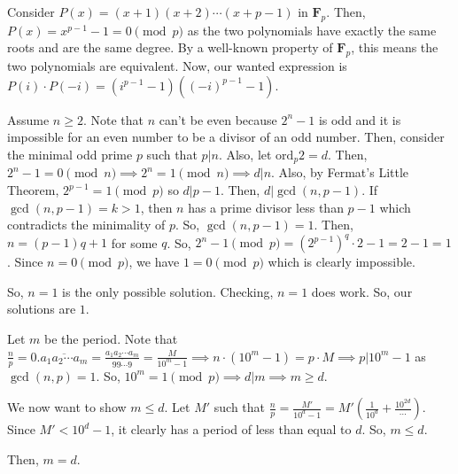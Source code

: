 \documentclass[11pt]{article}
\begin{document}

\begin{sol}
Consider $P(x)=(x+1)(x+2)\cdots (x+p-1)$ in $\mathbf{F}_{p}$. Then, $P(x)=x^{p-1}-1=0\pmod{p}$ as the two polynomials have exactly the same roots and are the same degree. By a well-known property of $\mathbf{F}_{p}$, this means the two polynomials are equivalent. Now, our wanted expression is $P(i)\cdot P(-i)=\boxed{(i^{p-1}-1)((-i)^{p-1}-1)}$.
\end{sol}


\begin{sol}
Assume $n\ge 2$. Note that $n$ can't be even because $2^{n}-1$ is odd and it is impossible for an even number to be a divisor of an odd number. Then, consider the minimal odd prime $p$ such that $p|n$. Also, let $\text{ord}_{p} 2 =d$. Then, $2^{n}-1=0\pmod{n} \implies 2^{n}=1\pmod{n}\implies d|n$. Also, by Fermat's Little Theorem, $2^{p-1}=1\pmod{p}$ so $d|p-1$. Then, $d|\gcd(n,p-1)$. If $\gcd(n,p-1)=k>1$, then $n$ has a prime divisor less than $p-1$ which contradicts the minimality of $p$. So, $\gcd(n,p-1)=1$. Then, $n=(p-1)q+1$ for some $q$. So, $2^{n}-1\pmod{p}=(2^{p-1})^{q}\cdot 2-1=2-1=1$. Since $n=0\pmod{p}$, we have $1=0\pmod{p}$ which is clearly impossible.

So, $n=1$ is the only possible solution. Checking, $n=1$ does work. So, our solutions are $\boxed{1}$.
\end{sol}


\begin{sol}[1]
Let $m$ be the period. Note that $\frac{n}{p}=0.\overline{a_{1}a_{2}\cdots a_{m}}=\frac{a_{1}a_{2}\cdots a_{m}}{\overline{99\cdots 9}}=\frac{M}{10^{m}-1}\implies n\cdot (10^{m}-1)=p\cdot M\implies p|10^{m}-1$ as $\gcd(n,p)=1$. So, $10^{m}=1\pmod{p}\implies d|m\implies m\ge d$.

We now want to show $m\leq d$. Let $M'$ such that $\frac{n}{p}=\frac{M'}{10^{d}-1}=M'(\frac{1}{10^d}+\frac{10^{2d}}\cdots)$. Since $M'< 10^{d}-1$, it clearly has a period of less than equal to $d$. So, $m\leq d$.

Then, $m=d$.
\end{sol}
\end{document}
